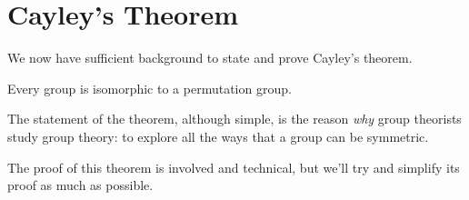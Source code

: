 \section{Cayley's Theorem}
We now have sufficient background to state and prove Cayley's theorem.

\begin{theorem}[Cayley]\label{thrm-cayley}
    Every group is isomorphic to a permutation group.
\end{theorem}

The statement of the theorem, although simple, is the reason \textit{why} group theorists study group theory: to explore all the ways that a group can be symmetric.

The proof of this theorem is involved and technical, but we'll try and simplify its proof as much as possible.

